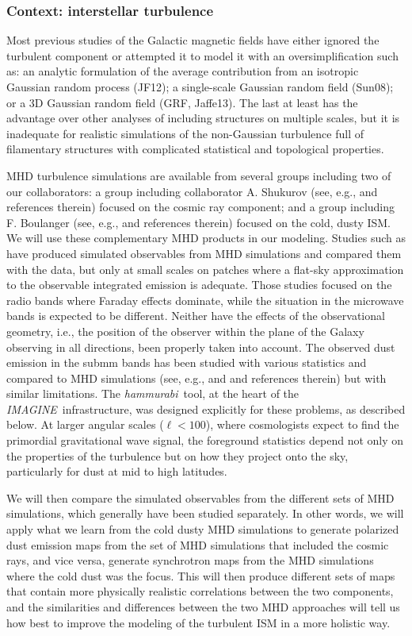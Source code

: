 \documentclass[12pt]{article}
\newcommand{\imagineSW}{\textsl{IMAGINE}}
\newcommand{\hammurabi}{\textsl{hammurabi}}
\begin{document}
\subsubsection*{Context:  interstellar turbulence}

Most previous studies of the Galactic magnetic fields have either ignored the turbulent component or attempted it to model it with an oversimplification such as: an analytic formulation of the average contribution from an isotropic Gaussian random process (JF12); a single-scale Gaussian random field (Sun08); or a 3D Gaussian random field (GRF, Jaffe13). The last at least has the advantage over other analyses of including structures on multiple  scales, but it is inadequate for realistic simulations of the non-Gaussian turbulence full of filamentary structures with complicated statistical and topological properties.

MHD turbulence simulations are available from several groups including two of our collaborators:  a group including collaborator A. Shukurov (see, e.g., \citealt{evirgen:2017} and references therein) focused on the cosmic ray component;  and a group including F. Boulanger (see, e.g., \citealt{pipXX} and references therein) focused on the cold, dusty ISM.  We will use these complementary MHD products in our modeling. Studies such as \citet{Burkhart:2012} have produced simulated observables from MHD simulations and compared them with the data, but only at small scales on patches where a flat-sky approximation to the observable integrated emission is adequate. Those studies focused on the radio bands where Faraday effects dominate, while the situation in the microwave bands is expected to be different. Neither have the effects of the observational geometry, i.e., the position of the observer within the plane of the Galaxy observing in all directions, been properly taken into account.  The observed dust emission in the submm bands has been studied with various statistics and compared to MHD simulations (see, e.g., \citealt{pipXX} and \citealt{pipLIV} and references therein) but with similar limitations. The \hammurabi\ tool, at the heart of the \imagineSW\ infrastructure, was designed explicitly for these problems, as described below.   At larger angular scales ($\ell < 100$), where cosmologists expect to find the primordial gravitational wave signal, the foreground statistics depend not only on the properties of the turbulence but on how they project onto the sky, particularly for dust at mid to high latitudes.  

We will then compare the simulated observables from the different sets of MHD simulations, which generally have been studied separately. In other words, we will apply what we learn from the cold dusty MHD simulations to generate polarized dust emission maps from the set of MHD simulations that included the cosmic rays, and vice versa, generate synchrotron maps from the MHD simulations where the cold dust was the focus. This will then produce different sets of maps that contain more physically realistic correlations between the two components, and the similarities and differences between the two MHD approaches will tell us how best to improve the modeling of the turbulent ISM in a more holistic way. 
\end{document}
